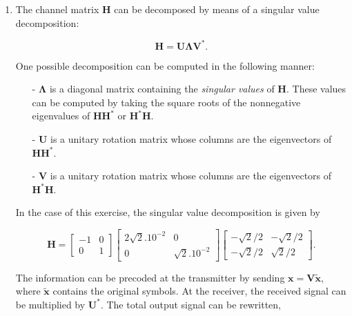 \documentclass [a4paper, 11pt] {article}
\begin{document}
    \begin{solution}
        
        \begin{enumerate}
        \item The channel matrix $\mathbf{H}$ can be decomposed by means of a singular value decomposition: 
        
        \begin{equation}\mathbf{H} = \mathbf{U}\mathbf{\Lambda}\mathbf{V}^*.\end{equation}
        
        One possible decomposition can be computed in the following manner: 
        
        \begin{itemize}
            \item[-] $\mathbf{\Lambda}$ is a diagonal matrix containing the \textit{singular values} of $\mathbf{H}$. These values can be computed by taking the square roots of the nonnegative eigenvalues of $\mathbf{H}\mathbf{H}^*$ or $\mathbf{H}^*\mathbf{H}$.
            \item[-] $\mathbf{U}$ is a unitary rotation matrix whose columns are the eigenvectors of  $\mathbf{H}\mathbf{H}^*$.
            \item[-] $\mathbf{V}$ is a unitary rotation matrix whose columns are the eigenvectors of  $\mathbf{H}^*\mathbf{H}$.
        \end{itemize}
        
        In the case of this exercise, the singular value decomposition is given by 
        
        \begin{equation}
            \mathbf{H} = \begin{bmatrix} -1 & 0 \\ 0 & 1 \end{bmatrix} \begin{bmatrix} 2\sqrt{2}. 10^{-2} & 0 \\ 0 & \sqrt{2}. 10^{-2} \end{bmatrix} \begin{bmatrix} -\sqrt{2}/2 & -\sqrt{2}/2 \\ -\sqrt{2}/2 & \sqrt{2}/2 \end{bmatrix}.
        \end{equation}
        
        The information can be precoded at the transmitter by sending $\mathbf{x} = \mathbf{V}\mathbf{\tilde{x}}$, where $\mathbf{\tilde{x}}$ contains the original symbols. At the receiver, the received signal can be multiplied by $\mathbf{U}^*$. The total output signal can be rewritten,
        

\end{enumerate}
\end{solution}
\end{document}
